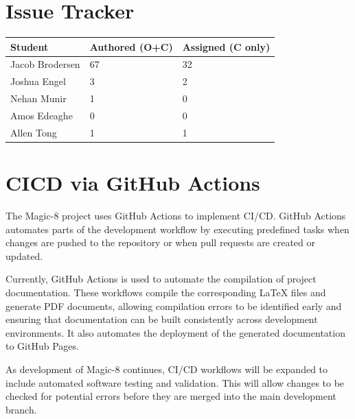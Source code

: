 \documentclass{article}
\begin{document}
\section{Issue Tracker}


\begin{table}[H]
\centering
\begin{tabular}{lll}
\toprule
\textbf{Student} & \textbf{Authored (O+C)} & \textbf{Assigned (C only)}\\
\midrule
Jacob Brodersen & 67 & 32 \\
Joshua Engel & 3 & 2\\
Nehan Munir & 1 & 0 \\
Amos Edeaghe & 0 & 0\\
Allen Tong & 1 & 1 \\
\bottomrule
\end{tabular}
\end{table}


\section{CICD via GitHub Actions}



The Magic-8 project uses GitHub Actions to implement CI/CD. GitHub Actions automates parts of the development workflow by executing predefined tasks when changes are pushed to the repository or when pull requests are created or updated.

Currently, GitHub Actions is used to automate the compilation of project documentation. These workflows compile the corresponding LaTeX files and generate PDF documents, allowing compilation errors to be identified early and ensuring that documentation can be built consistently across development environments. It also automates the deployment of the generated documentation to GitHub Pages.

As development of Magic-8 continues, CI/CD workflows will be expanded to include automated software testing and validation. This will allow changes to be checked for potential errors before they are merged into the main development branch.
\end{document}
